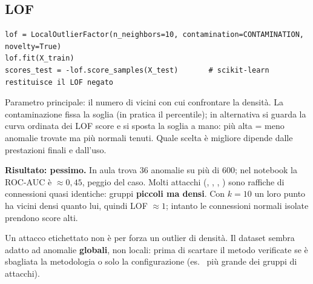 \subsection{LOF}
\begin{lstlisting}
lof = LocalOutlierFactor(n_neighbors=10, contamination=CONTAMINATION, novelty=True)
lof.fit(X_train)
scores_test = -lof.score_samples(X_test)       # scikit-learn restituisce il LOF negato
\end{lstlisting}
Parametro principale: il numero di vicini con cui confrontare la densità. La contaminazione fissa la soglia (in pratica il percentile);
in alternativa si guarda la curva ordinata dei LOF score e si sposta la soglia a mano: più alta = meno anomalie trovate ma più normali
tenuti. Quale scelta è migliore dipende dalle prestazioni finali e dall'uso.

\textbf{Risultato: pessimo.} In aula trova 36 anomalie su più di 600; nel notebook la ROC-AUC è $\approx 0{,}45$, peggio del caso.
Molti attacchi (, , , ) sono raffiche di connessioni quasi identiche: gruppi
\textbf{piccoli ma densi}. Con $k=10$ un loro punto ha vicini densi quanto lui, quindi LOF $\approx 1$; intanto le connessioni normali
isolate prendono score alti.
\begin{attenzione}
Un attacco etichettato non è per forza un outlier di densità. Il dataset sembra adatto ad anomalie \textbf{globali}, non locali: prima
di scartare il metodo verificate se è sbagliata la metodologia o solo la configurazione (es.\  più grande dei gruppi
di attacchi).
\end{attenzione}

